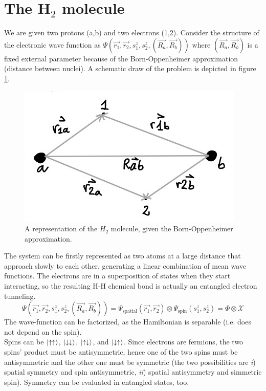 \section{The H$_2$ molecule}
We are given two protons (a,b) and two electrons (1,2). Consider the structure of the electronic wave function as $\Psi(\vec{r_1},\vec{r_2},s_1^z,s_2^z,(\vec{R_a},\vec{R_b}))$ where $(\vec{R_a},\vec{R_b})$ is a fixed external parameter because of the Born-Oppenheimer approximation (distance between nuclei). A schematic draw of the problem is depicted in figure \ref{fig:h2}.\\
\begin{figure}[htbp!]
	\centering
	\includegraphics[scale=0.30]{img_8}
	\caption{A representation of the $H_2$ molecule, given the Born-Oppenheimer approximation.}
	\label{fig:h2}
\end{figure}
\newline
The system can be firstly represented as two atoms at a large distance that approach slowly to each other, generating a linear combination of mean wave functions. The electrons are in a superposition of states when they start interacting, so the resulting H-H chemical bond is actually an entangled electron tunneling.
\[
\Psi(\vec{r_1},\vec{r_2},s_1^z,s_2^z,(\vec{R_a},\vec{R_b}))=\Psi_{\text{spatial}}(\vec{r_1},\vec{r_2})\otimes\Psi_{\text{spin}}(s_1^z,s_2^z)=\Phi\otimes\mathcal{X}
\]
The wave-function can be factorized, as the Hamiltonian is separable (i.e. does not depend on the spin).\\
Spins can be $\ket{\uparrow\uparrow}$, $\ket{\downarrow\downarrow}$, $\ket{\uparrow\downarrow}$, and $\ket{\downarrow\uparrow}$. Since electrons are fermions, the two spins' product must be antisymmetric, hence one of the two spins must be antisymmetric and the other one must be symmetric (the two possibilities are \textit{i}) spatial symmetry and spin antisymmetric, \textit{ii}) spatial antisymmetry and simmetric spin). Symmetry can be evaluated in entangled states, too. 

